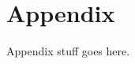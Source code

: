 \documentclass[Thesis.tex]{subfiles}
\begin{document}
\chapter{Appendix}

Appendix stuff goes here.
\end{document}
